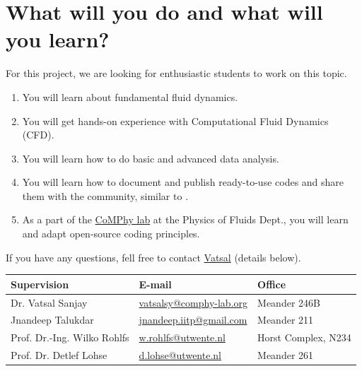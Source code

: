 \documentclass[a4paper,10pt]{article}
\begin{document}
\section*{What will you do and what will you learn?}
For this project, we are looking for enthusiastic students to work on this topic.
\begin{enumerate}
\itemsep0em
\item You will learn about fundamental fluid dynamics.
\item You will get hands-on experience with Computational Fluid Dynamics (CFD).
\item You will learn how to do basic and advanced data analysis.
\item You will learn how to document and publish ready-to-use codes and share them with the community, similar to \citet{basiliskVatsal, basiliskVatsalDropFilm, basiliskVatsalViscousBouncing}. 
\item As a part of the \href{https://comphy-lab.org}{CoMPhy lab} at the Physics of Fluids Dept., you will learn and adapt open-source coding principles. 

\end{enumerate}

If you have any questions, fell free to contact \href{mailto:vatsalsy@comphy-lab.org}{Vatsal} (details below).
\begin{center}
\begin{tabular}{|l|l|l|}
\hline \textbf{Supervision} & \textbf{E-mail} & \textbf{Office} \\
\hline Dr. Vatsal Sanjay & \href{mailto:vatsalsy@comphy-lab.org}{vatsalsy@comphy-lab.org} & Meander 246B \\
\hline Jnandeep Talukdar & \href{mailto:jnandeep.iitp@gmail.com}{jnandeep.iitp@gmail.com} & Meander 211 \\
\hline Prof. Dr.-Ing. Wilko Rohlfs   & \href{mailto:w.rohlfs@utwente.nl }{w.rohlfs@utwente.nl }& Horst Complex, N234 \\
\hline Prof. Dr. Detlef Lohse & \href{mailto:d.lohse@utwente.nl}{d.lohse@utwente.nl} & Meander 261  \\
\hline
\end{tabular}
\end{center}

\printbibliography
\end{document}
